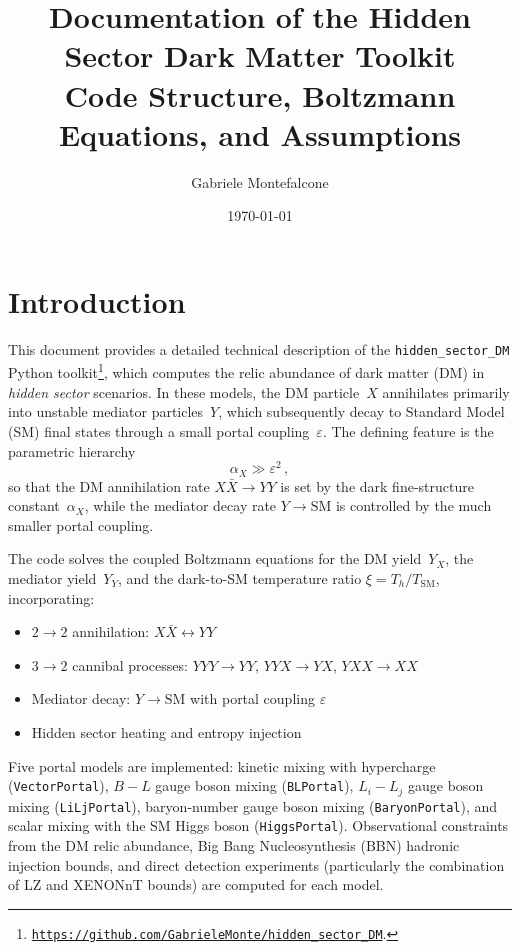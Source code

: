 \documentclass[11pt]{article}
\title{%
Documentation of 
the Hidden Sector Dark Matter Toolkit\\[0.5em]
\large Code Structure, Boltzmann Equations, and Assumptions
}
\author{Gabriele Montefalcone}
\date{\today}
\numberwithin{equation}{section}
\newcommand{\TD}{T_h}
\newcommand{\TSM}{T_{\text{SM}}}
\newcommand{\alphaX}{\alpha_X}
\newcommand{\epsX}{\varepsilon}
\begin{document}
\maketitle

\section{Introduction}
\label{sec:intro}

This document provides a detailed technical description of the \texttt{hidden\_sector\_DM} Python toolkit\footnote{\href{https://github.com/GabrieleMonte/hidden_sector_DM}{\texttt{https://github.com/GabrieleMonte/hidden\_sector\_DM}}.}, which computes the relic abundance of dark matter (DM) in \emph{hidden sector} scenarios. In these models, the DM particle~$X$ annihilates primarily into unstable mediator particles~$Y$, which subsequently decay to Standard Model (SM) final states through a small portal coupling~$\epsX$. The defining feature is the parametric hierarchy
\begin{equation}
    \alpha_X \gg \epsX^2\,,
\end{equation}
so that the DM annihilation rate $X\bar{X}\to YY$ is set by the dark fine-structure constant~$\alphaX$, while the mediator decay rate $Y\to \text{SM}$ is controlled by the much smaller portal coupling.

The code solves the coupled Boltzmann equations for the DM yield~$Y_X$, the mediator yield~$Y_Y$, and the dark-to-SM temperature ratio $\xi = \TD / \TSM$, incorporating:
\begin{itemize}
    \item $2\to2$ annihilation: $X\bar{X} \leftrightarrow YY$
    \item $3\to2$ cannibal processes: $YYY\to YY$, $YYX\to YX$, $YXX\to XX$
    \item Mediator decay: $Y\to\text{SM}$ with portal coupling $\epsX$
    \item Hidden sector heating and entropy injection
\end{itemize}

Five portal models are implemented: kinetic mixing with hypercharge (\texttt{VectorPortal}), $B-L$ gauge boson mixing (\texttt{BLPortal}), $L_i - L_j$ gauge boson mixing (\texttt{LiLjPortal}), baryon-number gauge boson mixing (\texttt{BaryonPortal}), and scalar mixing with the SM Higgs boson (\texttt{HiggsPortal}). Observational constraints from the DM relic abundance, Big Bang Nucleosynthesis (BBN) hadronic injection bounds, and direct detection experiments (particularly the combination of LZ and XENONnT bounds) are computed for each model.
\end{document}

